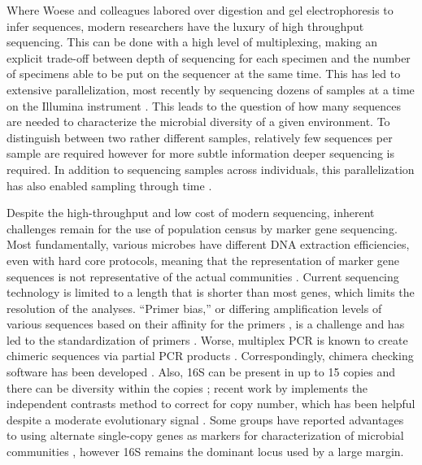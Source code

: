 \documentclass{amsart}
\begin{document}
Where Woese and colleagues labored over digestion and gel electrophoresis to infer sequences, modern researchers have the luxury of high throughput sequencing.
This can be done with a high level of multiplexing, making an explicit trade-off between depth of sequencing for each specimen and the number of specimens able to be put on the sequencer at the same time.
This has led to extensive parallelization, most recently by sequencing dozens of samples at a time on the Illumina instrument \citep{degnan2011illumina,caporaso2012ultra}.
This leads to the question of how many sequences are needed to characterize the microbial diversity of a given environment.
To distinguish between two rather different samples, relatively few sequences per sample are required \citep{kuczynski2010microbial} however for more subtle information deeper sequencing is required.
In addition to sequencing samples across individuals, this parallelization has also enabled sampling through time \citep{caporaso2011moving}.

Despite the high-throughput and low cost of modern sequencing, inherent challenges remain for the use of population census by marker gene sequencing.
Most fundamentally, various microbes have different DNA extraction efficiencies, even with hard core protocols, meaning that the representation of marker gene sequences is not representative of the actual communities \citep{morgan2010metagenomic}.
Current sequencing technology is limited to a length that is shorter than most genes, which limits the resolution of the analyses.
``Primer bias,'' or differing amplification levels of various sequences based on their affinity for the primers \citep{suzuki1996bias,polz1998bias}, is a challenge and has led to the standardization of primers \citep{methe2012framework}.
Worse, multiplex PCR is known to create chimeric sequences via partial PCR products \citep{hugenholtz2003chimeric,ashelford2005least,haas2011chimeric,schloss2011reducing}.
Correspondingly, chimera checking software has been developed \citep[including][]{ashelford2006new,edgar2011uchime}.
Also, 16S can be present in up to 15 copies and there can be diversity within the copies \citep{klappenbach2001rrndb};
recent work by \citet{kembel2012incorporating} implements the independent contrasts \citep{felsenstein1985phylogenies} method to correct for copy number, which has been helpful despite a moderate evolutionary signal \citep{klappenbach2000rrna}.
Some groups have reported advantages to using alternate single-copy genes as markers for characterization of microbial communities \citep[e.g.][]{case2007rpob,mcnabb2004hsp65}, however 16S remains the dominant locus used by a large margin.
\end{document}
